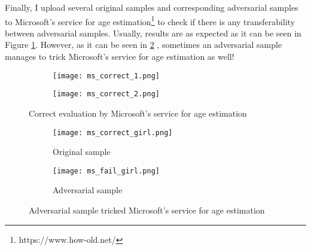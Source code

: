 Finally, I upload several original samples and corresponding adversarial samples to  Microsoft's service for age estimation\footnote{https://www.how-old.net/} to check if there is any transferability between adversarial samples. Usually, results are as expected as it can be seen in Figure \ref{fig:ms_correct}. However, as it can be seen in \ref{fig:ms_tricked} , sometimes an adversarial sample manages to trick Microsoft's service for age estimation as well!

\begin{figure}

\begin{subfigure}{.5\textwidth}
  \centering
  \texttt{[image: ms\_correct\_1.png]}
\end{subfigure}
\begin{subfigure}{.5\textwidth}
  \centering
  \texttt{[image: ms\_correct\_2.png]}
\end{subfigure}
\caption{Correct evaluation by Microsoft's service for age estimation}
\label{fig:ms_correct}
\end{figure}

\begin{figure}

\begin{subfigure}{.5\textwidth}
  \centering
  \texttt{[image: ms\_correct\_girl.png]}
      \caption{Original sample}
\end{subfigure}
\begin{subfigure}{.5\textwidth}
  \centering
  \texttt{[image: ms\_fail\_girl.png]}
        \caption{Adversarial sample}
\end{subfigure}
\caption{Adversarial sample tricked Microsoft's service for age estimation}
\label{fig:ms_tricked}
\end{figure}